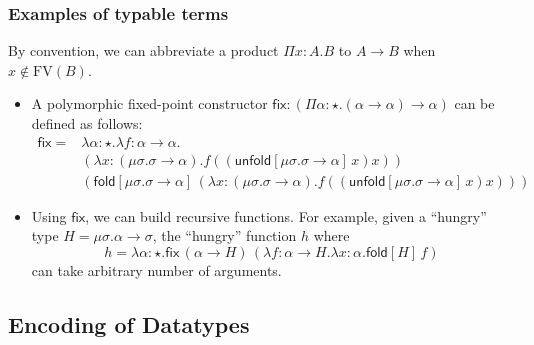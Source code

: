 \documentclass[oneside,a4paper]{article}
\numberwithin{equation}{section}
\newcommand{\fold}[2]{\mathsf{fold}[#1]\,#2}
\newcommand{\unfold}[2]{\mathsf{unfold}[#1]\,#2}
\begin{document}
\subsubsection{Examples of typable terms}

By convention, we can abbreviate a product $\Pi x:A.B$ to $A \to B$
when $x \not \in \mathrm{FV}(B)$.

\begin{itemize}
  \newcommand{\FPTypeU}{\mu\sigma . \sigma \to \alpha}
  \newcommand{\FPTermfxx}{\lambda
    x:(\FPTypeU).f((\unfold{\FPTypeU}{x})x)}
  \newcommand{\FP}{\mathsf{fix}} %
\item A polymorphic fixed-point constructor
  $\FP:(\Pi \alpha:\star.(\alpha \to \alpha) \to \alpha)$ can be
  defined as follows:
\begin{align*}
  \FP=&\lambda \alpha:\star . \lambda f:\alpha \to \alpha.\\
      &(\FPTermfxx)\\
      &(\fold{\FPTypeU}{(\FPTermfxx)})
\end{align*}
\newcommand{\HGType}{\mu\sigma. \alpha \to \sigma}%
\item Using $\FP$, we can build recursive functions. For example,
  given a ``hungry'' type $H=\HGType$, the ``hungry'' function $h$
  where
  \[h=\lambda \alpha:\star.\FP\,(\alpha \to H)\,(\lambda f:\alpha \to
  H.\lambda x:\alpha.\fold{H}{f})\]
  can take arbitrary number of arguments.
\end{itemize}

\subsection{Encoding of Datatypes}
\end{document}
